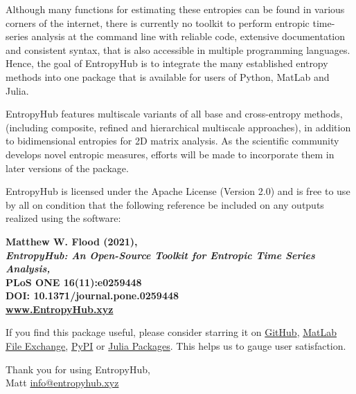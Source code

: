 \documentclass[12pt, a4paper, titlepage, openany]{book}
\begin{document}
Although many functions for estimating these entropies can be found in various corners of the internet, there is currently no toolkit to perform entropic time-series analysis at the command line with reliable code, extensive documentation and consistent syntax, that is also accessible in multiple programming languages. Hence, the goal of EntropyHub is to integrate the many established entropy methods into one package that is available for users of Python, MatLab and Julia.

\vspace{5mm}
EntropyHub features multiscale variants of all base and cross-entropy methods, (including composite, refined and hierarchical multiscale approaches), in addition to bidimensional entropies for 2D matrix analysis. As the scientific community develops novel entropic measures, efforts will be made to incorporate them in later versions of the package.


\noindent EntropyHub is licensed under the Apache License (Version 2.0) and is free to use by all on condition that the following reference be included on any outputs realized using the software:\\
\vspace{3mm}


\footnotesize
\indent\indent\textbf{Matthew W. Flood (2021),\\
\indent\indent\emph{EntropyHub: An Open-Source Toolkit for Entropic Time Series Analysis, }\\
\indent\indent PLoS ONE 16(11):e0259448 \\
\indent\indent DOI: 10.1371/journal.pone.0259448  \\
\indent\indent \href{www.EntropyHub.xyz}{www.EntropyHub.xyz}}

\normalsize \vspace{10mm}
\noindent If you find this package useful, please consider starring it on 
\href{www.github.com/MattWillFlood/EntropyHub}{GitHub}, 
\href{https://www.mathworks.com/matlabcentral/fileexchange/94185-entropyhub}{MatLab File Exchange}, 
\href{https://pypi.org/project/EntropyHub/}{PyPI} or 
\href{github.com/MattWillFlood/EntropyHub.jl}{Julia Packages}. This helps us to gauge user satisfaction.\vspace{15mm}

\noindent Thank you for using EntropyHub,\\

\noindent Matt	\newline
\textcolor{ehthree}{\scriptsize\underline{info@entropyhub.xyz}}
\end{document}

